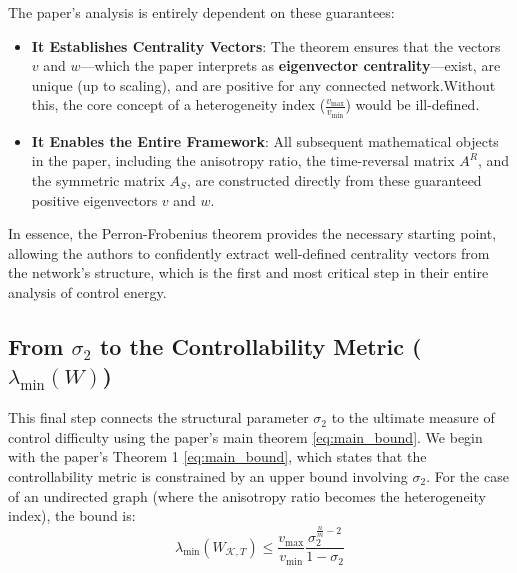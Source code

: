 \documentclass[11pt, a4paper]{article}
\begin{document}
The paper's analysis is entirely dependent on these guarantees:

\begin{itemize}
    \item \textbf{It Establishes Centrality Vectors}: The theorem ensures that the vectors $v$ and $w$---which the paper interprets as \textbf{eigenvector centrality}---exist, are unique (up to scaling), and are positive for any connected network.Without this, the core concept of a heterogeneity index ($\frac{v_{\max}}{v_{\min}}$) would be ill-defined.

    \item \textbf{It Enables the Entire Framework}: All subsequent mathematical objects in the paper, including the anisotropy ratio, the time-reversal matrix $A^R$, and the symmetric matrix $A_S$, are constructed directly from these guaranteed positive eigenvectors $v$ and $w$.
\end{itemize}

In essence, the Perron-Frobenius theorem provides the necessary starting point, allowing the authors to confidently extract well-defined centrality vectors from the network's structure, which is the first and most critical step in their entire analysis of control energy.
\subsection{From $\sigma_2$ to the Controllability Metric ($\lambda_{\min}(W)$)}
This final step connects the structural parameter $\sigma_2$ to the ultimate measure of control difficulty using the paper's main theorem \ref{eq:main_bound}.
We begin with the paper's Theorem 1 \ref{eq:main_bound}, which states that the controllability metric is constrained by an upper bound involving $\sigma_2$. For the case of an undirected graph (where the anisotropy ratio becomes the heterogeneity index), the bound is:
\begin{equation}
    \lambda_{\min}(W_{\mathcal{K},T}) \le \frac{v_{\max}}{v_{\min}}\frac{\sigma_{2}^{\frac{n}{m}-2}}{1-\sigma_{2}}
\end{equation}
\end{document}
